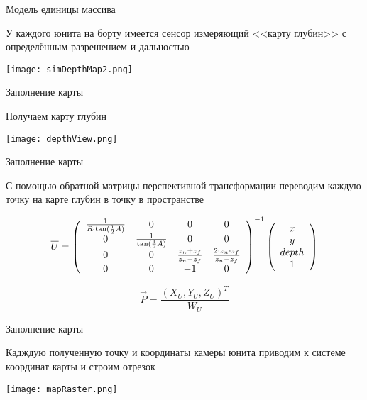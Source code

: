 \begin{tslide}{Модель единицы массива}

    У каждого юнита на борту имеется сенсор измеряющий \newline
    <<карту глубин>> с определённым разрешением и дальностью
    
    \texttt{[image: simDepthMap2.png]}

\end{tslide}

\begin{tslide}{Заполнение карты}

    Получаем карту глубин

    \begin{center}
    \texttt{[image: depthView.png]}
    \end{center}

\end{tslide}

\begin{tslide}{Заполнение карты}

    С помощью обратной матрицы перспективной трансформации
    переводим каждую точку на карте глубин в точку в пространстве

$$
\vec U = \left( \begin{array}{c c c c}
        \frac{1}{ R \cdot \tan( \frac{1}{2} A ) } & 0 & 0 & 0 \\
        0 & \frac{1}{ \tan( \frac{1}{2} A ) } & 0 & 0 \\
        0 & 0 & \frac{ z_{n} + z_{f} }{ z_{n}-z_{f} } & \frac{ 2 \cdot z_{n} \cdot z_{f} }{ z_{n} - z_{f} } \\
        0 & 0 & -1 & 0 \end{array} \right)^{-1}
    \left( \begin{array}{c} x \\ y \\ depth \\ 1 \end{array} \right)
$$

$$\vec P = \frac{( X_U, Y_U, Z_U )^T}{ W_U } $$

\end{tslide}

\begin{tslide}{Заполнение карты}

    Кадждую полученную точку и координаты камеры юнита
    приводим к системе координат карты и строим отрезок

    \vfill

    \begin{center}
    \texttt{[image: mapRaster.png]}
    \end{center}

    \vfill

\end{tslide}

